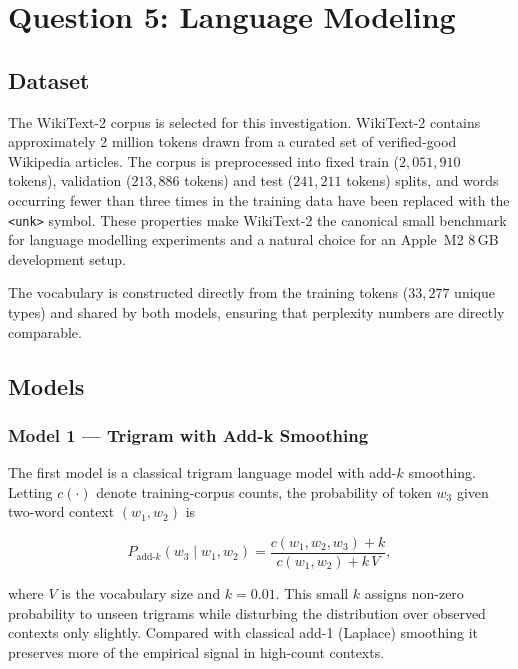 
\section{Question 5: Language Modeling}

\subsection{Dataset}

The WikiText-2 corpus \cite{merity2017wikitext} is selected for this
investigation. WikiText-2 contains approximately 2 million tokens drawn
from a curated set of verified-good Wikipedia articles. The corpus is
preprocessed into fixed train ($2{,}051{,}910$ tokens), validation
($213{,}886$ tokens) and test ($241{,}211$ tokens) splits, and
words occurring fewer than three times in the training data have been
replaced with the \texttt{<unk>} symbol. These properties make
WikiText-2 the canonical small benchmark for language modelling
experiments and a natural choice for an Apple~M2 8\,GB development
setup.

The vocabulary is constructed directly from the training tokens
($33{,}277$ unique types) and shared by both models, ensuring that
perplexity numbers are directly comparable.

\subsection{Models}

\subsubsection{Model 1 — Trigram with Add-k Smoothing}

The first model is a classical trigram language model with add-$k$
smoothing. Letting $c(\cdot)$ denote training-corpus counts, the
probability of token $w_3$ given two-word context $(w_1, w_2)$ is

\[
P_{\text{add-}k}(w_3 \mid w_1, w_2) =
\frac{c(w_1, w_2, w_3) + k}{c(w_1, w_2) + k\,V},
\]

where $V$ is the vocabulary size and $k = 0.01$. This small $k$ assigns
non-zero probability to unseen trigrams while disturbing the
distribution over observed contexts only slightly. Compared with
classical add-1 (Laplace) smoothing it preserves more of the empirical
signal in high-count contexts.

